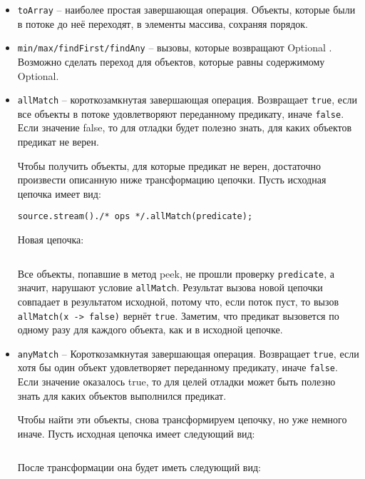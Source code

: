 \begin{itemize}
	\item \texttt{toArray} -- наиболее простая завершающая операция. Объекты, которые были в потоке до неё переходят, в элементы массива, сохраняя порядок.
	\item \texttt{min/max/findFirst/findAny} -- вызовы, которые возвращают Optional \cite{java:optional}. Возможно сделать переход для объектов, которые равны содержимому Optional.
	\item \texttt{allMatch} -- короткозамкнутая завершающая операция. Возвращает \texttt{true}, если все объекты в потоке удовлетворяют переданному предикату, иначе \texttt{false}. Если значение false, то для отладки будет полезно знать, для каких объектов предикат не верен.
	
	Чтобы получить объекты, для которые предикат не верен, достаточно произвести описанную ниже трансформацию цепочки. Пусть исходная цепочка имеет вид:
	
	\texttt{source.stream()./* ops */.allMatch(predicate);}

	Новая цепочка:
	
	\inputminted{java}{chapter2/code/allMatchTransform.java}
	
	Все объекты, попавшие в метод peek, не прошли проверку \texttt{predicate}, а значит, нарушают условие \texttt{allMatch}. Результат вызова новой цепочки совпадает в результатом исходной, потому что, если поток пуст, то вызов \\ \texttt{allMatch(x -> false)} вернёт \texttt{true}. Заметим, что предикат вызовется по одному разу для каждого объекта, как и в исходной цепочке.
	
	\item \texttt{anyMatch} -- Короткозамкнутая завершающая операция. Возвращает \texttt{true}, если хотя бы один объект удовлетворяет переданному предикату, иначе \texttt{false}. Если значение оказалось true, то для целей отладки может быть полезно знать для каких объектов выполнился предикат.
	
	Чтобы найти эти объекты, снова трансформируем цепочку, но уже немного иначе. Пусть исходная цепочка имеет следующий вид: 
	
	\inputminted{java}{chapter2/code/anyMatch.java}
	
	После трансформации она будет иметь следующий вид:
	
	\inputminted{java}{chapter2/code/anyMatchTransform.java}
	

\end{itemize}
